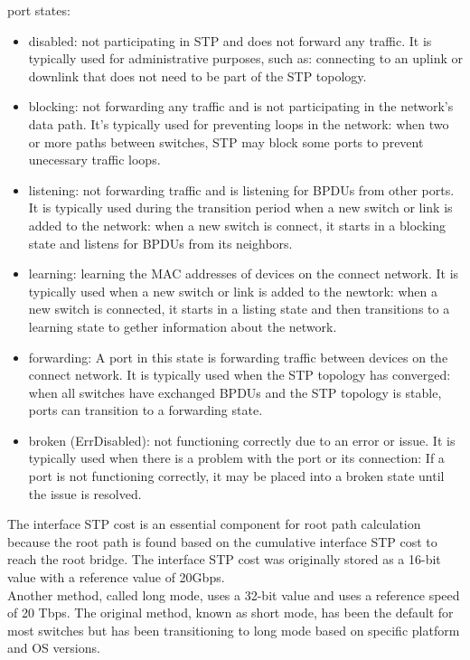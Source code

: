 \documentclass[parindent=0pt]{article}
\begin{document}
port states:
	\begin{itemize}
		\item disabled: not participating in STP and does not forward any traffic. It is typically used for administrative purposes, such as: connecting to an uplink or downlink that does not need to be part of the STP topology. 
		\item blocking: not forwarding any traffic and is not participating in the network's data path. It's typically used for preventing loops in the network: when two or more paths between switches, STP may block some ports to prevent unecessary traffic loops.
		\item listening: not forwarding traffic and is listening for BPDUs from other ports. It is typically used during the transition period when a new switch or link is added to the network: when a new switch is connect, it starts in a blocking state and listens for BPDUs from its neighbors.
		\item learning: learning the MAC addresses of devices on the connect network. It is typically used when a new switch or link is added to the newtork: when a new switch is connected, it starts in a listing state and then transitions to a learning state to gether information about the network.
		\item forwarding: A port in this state is forwarding traffic between devices on the connect network. It is typically used when the STP topology has converged: when all switches have exchanged BPDUs and the STP topology is stable, ports can transition to a forwarding state.
		\item broken (ErrDisabled): not functioning correctly due to an error or issue. It is typically used when there is a problem with the port or its connection: If a port is not functioning correctly, it may be placed into a broken state until the issue is resolved.
	\end{itemize}

The interface STP cost is an essential component for root path calculation because the root path is found based on the cumulative interface STP cost to reach the root bridge. The interface STP cost was originally stored as a 16-bit value with a reference value of 20Gbps.\\

Another method, called long mode, uses a 32-bit value and uses a reference speed of 20 Tbps. The original method, known as short mode, has been the default for most switches but has been transitioning to long mode based on specific platform and OS versions.\\
\end{document}
